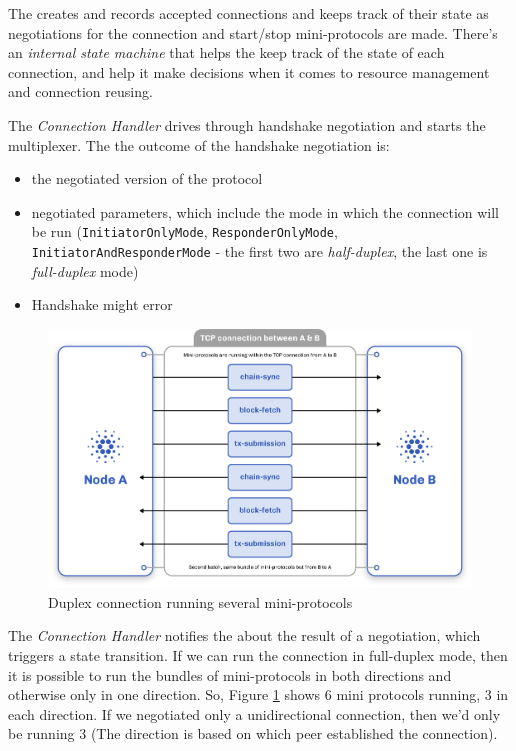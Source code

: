 The \Connmngr{} creates and records accepted connections and keeps track of their state
as negotiations for the connection and start/stop mini-protocols are made. There's an
\emph{internal state machine} that helps the \Connmngr{} keep track of the state of each
connection, and help it make decisions when it comes to resource management and
connection reusing.

The \emph{Connection Handler} drives through handshake negotiation and starts the multiplexer. The
the outcome of the handshake negotiation is:

\begin{itemize}
    \item the negotiated version of the protocol
    \item negotiated parameters, which include the mode in which the connection will be
      run (\texttt{InitiatorOnlyMode}, \texttt{ResponderOnlyMode},\\
      \texttt{InitiatorAndResponderMode} - the first two are \emph{half-duplex}, the last
      one is \emph{full-duplex} mode)
    \item Handshake might error
\end{itemize}

\begin{figure}
    \centering
    \includegraphics[width=\linewidth]{figure/node-to-node-ipc.png}
    \caption{Duplex connection running several mini-protocols}
    \label{fig:protocol-diagram}
\end{figure}

The \emph{Connection Handler} notifies the \Connmngr{} about the result of a negotiation, which
triggers a state transition. If we can run the connection in full-duplex mode,
then it is possible to run the bundles of mini-protocols in both directions and otherwise only in one direction.
So, Figure \ref{fig:protocol-diagram} shows $6$ mini protocols running, $3$ in each direction.
If we negotiated only a unidirectional connection, then we'd only be running $3$
(The direction is based on which peer established the connection).

